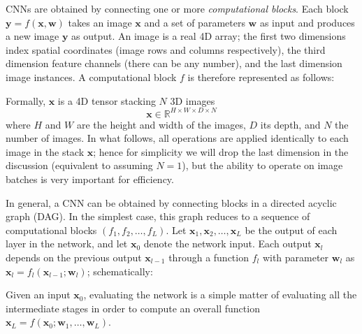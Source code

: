 \documentclass[12pt]{article}
\newcommand{\real}{\mathbb{R}}
\newcommand{\bx}{\mathbf{x}}
\newcommand{\by}{\mathbf{y}}
\newcommand{\bw}{\mathbf{w}}
\begin{document}
CNNs are obtained by connecting one or more \emph{computational blocks}. Each block $\by = f(\bx,\bw)$ takes an image $\bx$ and a set of parameters $\bw$ as input and produces a new image $\by$ as output. An image is a real 4D array; the first two dimensions index spatial coordinates (image rows and columns respectively), the third dimension feature channels (there can be any number), and the last dimension image instances. A computational block $f$ is therefore represented as follows:
\begin{center}
\end{center}
Formally, $\bx$ is a 4D tensor stacking $N$ 3D images
\[
   \bx \in \real^{H \times W \times D \times N}
\]
where $H$ and $W$ are the height and width of the images, $D$ its depth, and $N$ the number of images. In what follows, all operations are applied identically to each image in the stack $\bx$; hence for simplicity we will drop the last dimension in the discussion (equivalent to assuming $N=1$), but the ability to operate on image batches is very important for efficiency.

In general, a CNN can be obtained by connecting blocks in a directed acyclic graph (DAG). In the simplest case, this graph reduces to a sequence of computational blocks $(f_1,f_2,\dots,f_L)$. Let $\bx_1,\bx_2,\dots,\bx_L$ be the output of each layer in the network, and let $\bx_0$ denote the network input. Each output $\bx_l$ depends on the previous output $\bx_{l-1}$ through a function $f_l$ with parameter $\bw_l$ as $\bx_l = f_l(\bx_{l-1};\bw_l)$; schematically:
\begin{center}
\end{center}
Given an input $\bx_0$, evaluating the network is a simple matter of evaluating all the intermediate stages in order to compute an overall function $\bx_L = f(\bx_0;\bw_1,\dots,\bw_L)$. 
\end{document}
